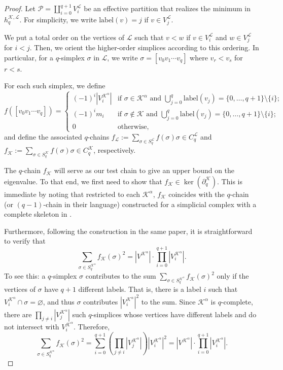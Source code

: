 \documentclass{article}
\newcommand{\KK}{\mathcal{K}}
\newcommand{\LL}{\mathcal{L}}
\begin{document}
\begin{proof}
Let $\mathcal{P}=\coprod_{i=0}^{q+1}V^\LL_i$ be an effective partition that realizes the minimum in $h_{q}^{\KK, \LL}$. For simplicity, we write $\mathrm{label}(v) = j$ if $v\in V_j^\LL$.  

We put a total order on the vertices of $\LL$ such that $v<w$ if $v\in V_i^\LL$ and $w\in V_j^\LL$ for $i<j$. Then, we orient the higher-order simplices according to this ordering. In particular, for a $q$-simplex $\sigma$ in $\LL$, we write $\sigma = [v_0v_1\cdots v_q]$ where $v_r < v_s$ for $r < s$.

For each such simplex, we define
\[
f([v_0v_1\cdots v_q])=
\begin{cases}
    (-1)^i|V^{\KK^\alpha}_{i}| & \text{if } \sigma \in \KK^\alpha \text{ and } \bigcup_{j=0}^q \mathrm{label}(v_j) = \{0, \ldots, q+1\}\setminus \{i\};\\
    (-1)^im_{i} & \text{if } \sigma \notin \KK \text{ and } \bigcup_{j=0}^q \mathrm{label}(v_j) = \{0, \ldots, q+1\}\setminus \{i\};\\
    0 & \text{otherwise},
\end{cases}
\]
and define the associated $q$-chains $f_\LL:=\sum_{\sigma\in S_q^\LL}f(\sigma)\sigma\in C_q^\LL$ and 
$f_\KK:=\sum_{\sigma\in S_q^\KK}f(\sigma)\sigma\in C_q^\KK$, respectively.

The $q$-chain $f_\KK$ will serve as our test chain to give an upper bound on the eigenvalue. To that end, we first need to show that $f_\KK\in \ker(\partial_q^\KK)$. This is immediate by noting that restricted to each $\KK^\alpha$, $f_\KK$ coincides with the $q$-chain (or $(q-1)$-chain in their language) constructed for a simplicial complex with a complete skeleton in \cite{MR3516884}.  

Furthermore, following the construction in the same paper, it is straightforward to verify that 
\[\sum_{\sigma\in S_q^{\KK^\alpha}} f_{\KK}(\sigma)^2 = |V^{\KK^\alpha}|\cdot \prod_{i=0}^{q+1}|V^{\KK^\alpha}_i|.\]
To see this: a $q$-simplex $\sigma$ contributes to the sum $\sum_{\sigma\in S_{q}^{\KK^\alpha}}f_\KK(\sigma)^2$ only if the vertices of $\sigma$ have $q+1$ different labels. That is, there is a label $i$ such that $V_i^{\KK^\alpha}\cap \sigma=\varnothing$, and thus $\sigma$ contributes $|V_i^{\KK^\alpha}|^2$ to the sum. Since $\KK^\alpha$ is $q$-complete, there are $\prod_{j \neq i} |V_j^{\KK^\alpha}|$ such $q$-simplices whose vertices have different labels and do not intersect with $V_i^{\KK^\alpha}$. Therefore,
\[
\sum_{\sigma\in S_{q}^{\KK^\alpha}}f_\KK(\sigma)^2=
\sum_{i=0}^{q+1}\left(\prod_{j\neq i}|V_j^{\KK^\alpha}|\right) |V_i^{\KK^\alpha}|^2=
|V^{\KK^\alpha}|\cdot \prod_{i=0}^{q+1}|V^{\KK^\alpha}_i|.
\]


\end{proof}
\end{document}
